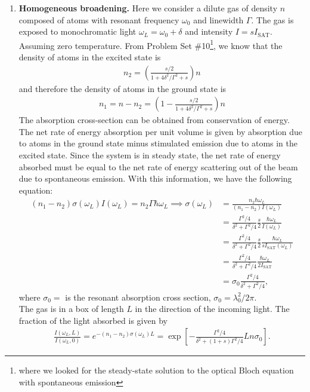 \documentclass{article}
\theoremstyle{definition}
\newcommand{\f}[2]{\frac{#1}{#2}}
\newcommand{\lp}{\left(}
\newcommand{\rp}{\right)}
\newcommand{\lb}{\left[}
\newcommand{\rb}{\right]}
\begin{document}
\begin{enumerate}[label = (\alph*)]
	\item \textbf{Homogeneous broadening.} Here we consider  a dilute gas of density $n$ composed of atoms with resonant frequency $\omega_0$ and linewidth $\Gamma$. The gas is exposed to monochromatic light $\omega_L = \omega_0 + \delta$ and intensity $I = sI_\text{SAT}$. Assuming zero temperature. From Problem Set \#10\footnote{where we looked for the steady-state solution to the optical Bloch equation with spontaneous emission}, we know that the density of atoms in the excited state is 
	\begin{align*}
	n_2 = \lp \f{s/2}{1 + 4\delta^2/\Gamma^2 + s} \rp n 
	\end{align*}
	and therefore the density of atoms in the ground state is 
	\begin{align*}
	n_1 = n - n_2 = \lp 1- \f{s/2}{1 + 4\delta^2/\Gamma^2 + s} \rp n
	\end{align*}
	The absorption cross-section can be obtained from conservation of energy. The net rate of energy absorption per unit volume is given by absorption due to atoms in the ground state minus stimulated emission due to atoms in the excited state. Since the system is in steady state, the net rate of energy absorbed must be equal to the net rate of energy scattering out of the beam due to spontaneous emission. With this information, we have the following equation:
	\begin{align*}
	(n_1 - n_2)\sigma(\omega_L) I(\omega_L) = n_2 \Gamma \hbar \omega_L \implies \sigma(\omega_L) &= \f{n_2 \hbar \omega_L}{(n_1  - n_2) I(\omega_L)} \\
	&= \f{\Gamma^2/4}{\delta^2 + \Gamma^2/4} \f{s}{2} \f{\hbar \omega_L}{I(\omega_L)} \\
	&= \f{\Gamma^2/4}{\delta^2 + \Gamma^2/4} \f{s}{2} \f{\hbar \omega_L}{sI_\text{SAT}(\omega_L)} \\
	&= \f{\Gamma^2/4}{\delta^2 + \Gamma^2/4}  \f{\hbar \omega_L}{2I_\text{SAT}} \\
	&= \sigma_0 \f{\Gamma^2/4}{\delta^2 + \Gamma^2/4},
	\end{align*}
	where $\sigma_0 = $ is the resonant absorption cross section, $\sigma_0 = \lambda_0^2/2\pi$.\\
	
	
	
	The gas is in a box of length $L$ in the direction of the incoming light. The fraction of the light absorbed is given by 
	\begin{align*}
	\f{I(\omega_L, L)}{I(\omega_L,0)} = e^{-(n_1 - n_2)\sigma(\omega_L)L} = \exp\lb -\f{\Gamma^2/4}{\delta^2+(1+s)\Gamma^2/4} L n \sigma_0 \rb. 
	\end{align*}
	

\end{enumerate}
\end{document}
